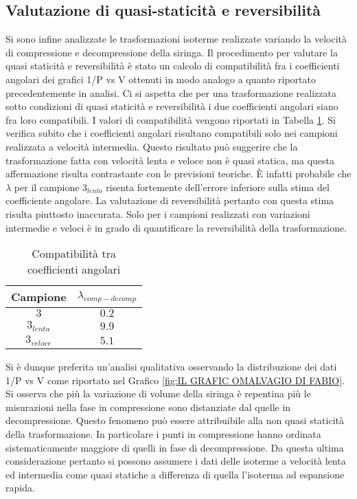 \documentclass[a4paper,11pt,oneside]{article}
\begin{document}
\subsection{Valutazione di quasi-staticità e reversibilità}
Si sono infine analizzate le trasformazioni isoterme realizzate variando la velocità di compressione e decompressione della siringa.
Il procedimento per valutare la quasi staticità e reversibilità è stato un calcolo di compatibilità fra i coefficienti angolari dei grafici 1/P vs V ottenuti in modo analogo a quanto riportato precedentemente in analisi. Ci si aspetta che per una trasformazione realizzata sotto condizioni di quasi staticità e reversibilità i due coefficienti angolari siano fra loro compatibili. I valori di compatibilità vengono riportati in Tabella \ref{tab:comp_ango_qs}. Si verifica subito che i coefficienti angolari risultano compatibili solo nei campioni realizzata a velocità intermedia. Questo risultato può suggerire che la trasformazione fatta con velocità lenta e veloce non è quasi statica, ma questa affermazione risulta contrastante con le previsioni teoriche. È infatti probabile che $\lambda$ per il campione $3_{lento}$ risenta fortemente dell'errore inferiore sulla stima del coefficiente angolare. La valutazione di reversibilità pertanto con questa stima risulta piuttosto inaccurata. Solo per i campioni realizzati con variazioni intermedie e veloci è in grado di quantificare la reversibilità della trasformazione.
\begin{table}[h!]
    \centering
    \begin{tabular}{|c|c|}
        \hline
        Campione & $\lambda_{comp-decomp}$\\ \hline
        \rowcolor[rgb]{0.85,0.85,0.85}$3$ & $0.2$\\ \hline
        $3_{lenta}$ & $9.9$\\ \hline
        \rowcolor[rgb]{0.85,0.85,0.85}$3_{veloce}$ & $5.1$\\ \hline
    \end{tabular}
    \caption{Compatibilità tra coefficienti angolari}
    \label{tab:comp_ango_qs}
\end{table}

Si è dunque preferita un'analisi qualitativa osservando la distribuzione dei dati 1/P vs V come riportato nel Grafico \ref{fig:IL GRAFIC OMALVAGIO DI FABIO}. Si osserva che più la variazione di volume della siringa è repentina più le misurazioni nella fase in compressione sono distanziate dal quelle in decompressione. Questo fenomeno può essere attribuibile alla non quasi staticità della trasformazione. In particolare i punti in compressione hanno ordinata sistematicamente maggiore di quelli in fase di decompressione. Da questa ultima considerazione pertanto si possono assumere i dati delle isoterme a velocità lenta ed intermedia come quasi statiche a differenza di quella l'isoterma ad espansione rapida.  
\end{document}
